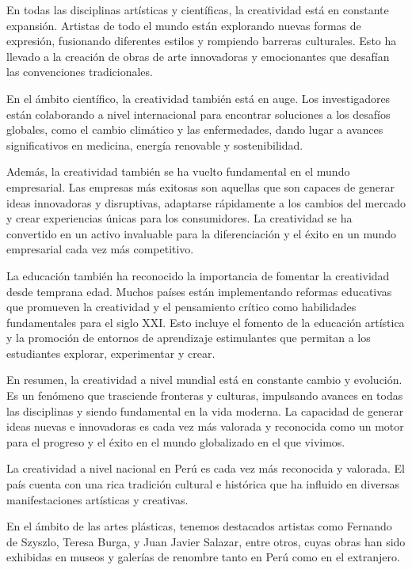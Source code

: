 \documentclass[12pt,a4paper]{article}
\begin{document}
En todas las disciplinas artísticas y científicas, la creatividad está en constante expansión. Artistas de todo el mundo están explorando nuevas formas de expresión, fusionando diferentes estilos y rompiendo barreras culturales. Esto ha llevado a la creación de obras de arte innovadoras y emocionantes que desafían las convenciones tradicionales.

En el ámbito científico, la creatividad también está en auge. Los investigadores están colaborando a nivel internacional para encontrar soluciones a los desafíos globales, como el cambio climático y las enfermedades, dando lugar a avances significativos en medicina, energía renovable y sostenibilidad.

Además, la creatividad también se ha vuelto fundamental en el mundo empresarial. Las empresas más exitosas son aquellas que son capaces de generar ideas innovadoras y disruptivas, adaptarse rápidamente a los cambios del mercado y crear experiencias únicas para los consumidores. La creatividad se ha convertido en un activo invaluable para la diferenciación y el éxito en un mundo empresarial cada vez más competitivo.

La educación también ha reconocido la importancia de fomentar la creatividad desde temprana edad. Muchos países están implementando reformas educativas que promueven la creatividad y el pensamiento crítico como habilidades fundamentales para el siglo XXI. Esto incluye el fomento de la educación artística y la promoción de entornos de aprendizaje estimulantes que permitan a los estudiantes explorar, experimentar y crear.

En resumen, la creatividad a nivel mundial está en constante cambio y evolución. Es un fenómeno que trasciende fronteras y culturas, impulsando avances en todas las disciplinas y siendo fundamental en la vida moderna. La capacidad de generar ideas nuevas e innovadoras es cada vez más valorada y reconocida como un motor para el progreso y el éxito en el mundo globalizado en el que vivimos.


La creatividad a nivel nacional en Perú es cada vez más reconocida y valorada. El país cuenta con una rica tradición cultural e histórica que ha influido en diversas manifestaciones artísticas y creativas.

En el ámbito de las artes plásticas, tenemos destacados artistas como Fernando de Szyszlo, Teresa Burga, y Juan Javier Salazar, entre otros, cuyas obras han sido exhibidas en museos y galerías de renombre tanto en Perú como en el extranjero.
\end{document}
